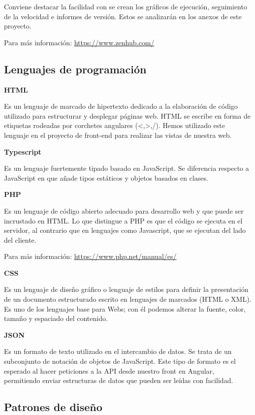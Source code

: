 Conviene destacar la facilidad con se crean los gráficos de ejecución, seguimiento de la velocidad e informes de versión. Estos se  analizarán en los anexos de este proyecto.

Para más información: \url{https://www.zenhub.com/}

\subsection{Lenguajes de programación}


\textbf{HTML}

Es un lenguaje de marcado de hipertexto dedicado a la elaboración de código utilizado para estructurar y desplegar  páginas web.
HTML se escribe en forma de etiquetas rodeadas por corchetes angulares (<,>,/). Hemos utilizado este lenguaje en el proyecto de front-end  para realizar las vistas de nuestra web.

\textbf{Typescript}

Es un lenguaje fuertemente tipado basado en JavaScript. Se diferencia respecto a JavaScript en que añade tipos estáticos y objetos basados en clases.

\textbf{PHP}

Es un lenguaje de código abierto adecuado para desarrollo web y que puede ser incrustado en HTML. Lo que distingue a PHP es que el código se ejecuta en el servidor, al contrario que en lenguajes como Javascript, que se ejecutan del lado del cliente.

Para más información: \url{https://www.php.net/manual/es/}

\textbf{CSS}

Es un lenguaje de diseño gráfico o lenguaje de estilos para definir la presentación de un documento estructurado escrito en lenguajes de marcados (HTML o XML). Es uno de los lenguajes base para Webs; con él podemos alterar la fuente, color, tamaño y espaciado del contenido.

\textbf{JSON}

Es un formato de texto utilizado en el intercambio de datos. Se trata de un subconjunto de notación de objetos de JavaScript.
Este tipo de formato es el esperado al hacer peticiones a la API desde nuestro front en Angular, permitiendo enviar estructuras de datos que pueden ser leídas con facilidad.

\subsection{Patrones de diseño}

